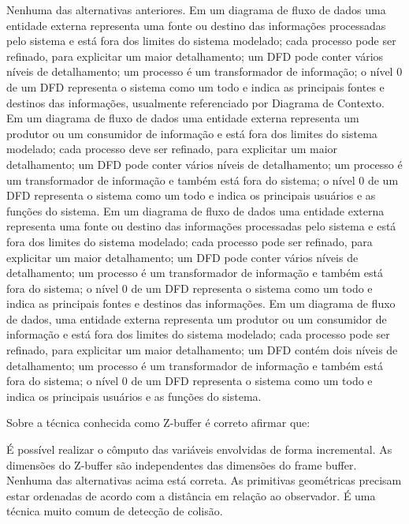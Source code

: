 \documentclass[12pt, addpoints]{exam}
\begin{document}
\begin{questions}
\begin{choices}
\choice Nenhuma das alternativas anteriores.
\choice Em um diagrama de fluxo de dados uma entidade externa representa uma fonte ou destino das informações processadas pelo sistema e está fora dos limites do sistema modelado; cada processo pode ser refinado, para explicitar um maior detalhamento; um DFD pode conter vários níveis de detalhamento; um processo é um transformador de informação; o nível 0 de um DFD representa o sistema como um todo e indica as principais fontes e destinos das informações, usualmente referenciado por Diagrama de Contexto.
\choice Em um diagrama de fluxo de dados uma entidade externa representa um produtor ou um consumidor de informação e está fora dos limites do sistema modelado; cada processo deve ser refinado, para explicitar um maior detalhamento; um DFD pode conter vários níveis de detalhamento; um processo é um transformador de informação e também está fora do sistema; o nível 0 de um DFD representa o sistema como um todo e indica os principais usuários e as funções do sistema.
\choice Em um diagrama de fluxo de dados uma entidade externa representa uma fonte ou destino das informações processadas pelo sistema e está fora dos limites do sistema modelado; cada processo pode ser refinado, para explicitar um maior detalhamento; um DFD pode conter vários níveis de detalhamento; um processo é um transformador de informação e também está fora do sistema; o nível 0 de um DFD representa o sistema como um todo e indica as principais fontes e destinos das informações.
\choice Em um diagrama de fluxo de dados, uma entidade externa representa um produtor ou um consumidor de informação e está fora dos limites do sistema modelado; cada processo pode ser refinado, para explicitar um maior detalhamento; um DFD contém dois níveis de detalhamento; um processo é um transformador de informação e também está fora do sistema; o nível 0 de um DFD representa o sistema como um todo e indica os principais usuários e as funções do sistema.
\end{choices}

\question

Sobre a técnica conhecida como Z-buffer é correto afirmar que:
\begin{choices}
\choice É possível realizar o cômputo das variáveis envolvidas de forma incremental.
\choice As dimensões do Z-buffer são independentes das dimensões do frame buffer. 
\choice Nenhuma das alternativas acima está correta. 
\choice As primitivas geométricas precisam estar ordenadas de acordo com a distância em relação ao observador. 
\choice É uma técnica muito comum de detecção de colisão. 
\end{choices}


\end{questions}
\end{document}
